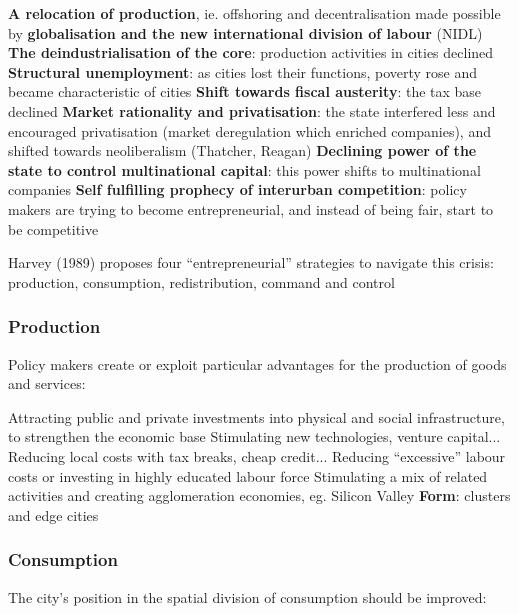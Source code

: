 \documentclass{article}
\begin{document}
\begin{outline}
	\1 \textbf{A relocation of production}, ie. offshoring and decentralisation made possible by \textbf{globalisation and the new international division of labour} (NIDL)
	\1 \textbf{The deindustrialisation of the core}: production activities in cities declined
	\1 \textbf{Structural unemployment}: as cities lost their functions, poverty rose and became characteristic of cities
	\1 \textbf{Shift towards fiscal austerity}: the tax base declined
	\1 \textbf{Market rationality and privatisation}: the state interfered less and encouraged privatisation (market deregulation which enriched companies), and shifted towards neoliberalism (Thatcher, Reagan)
	\1 \textbf{Declining power of the state to control multinational capital}: this power shifts to multinational companies
	\1 \textbf{Self fulfilling prophecy of interurban competition}: policy makers are trying to become entrepreneurial, and instead of being fair, start to be competitive
\end{outline}

Harvey (1989) proposes four ``entrepreneurial'' strategies to navigate this crisis: production, consumption, redistribution, command and control

\subsubsection{Production}

Policy makers create or exploit particular advantages for the production of goods and services:

\begin{outline}
	\1 Attracting public and private investments into physical and social infrastructure, to strengthen the economic base 
	\1 Stimulating new technologies, venture capital...
	\1 Reducing local costs with tax breaks, cheap credit...
	\1 Reducing ``excessive'' labour costs or investing in highly educated labour force
	\1 Stimulating a mix of related activities and creating agglomeration economies, eg. Silicon Valley
	\1 \textbf{Form}: clusters and edge cities
\end{outline}

\subsubsection{Consumption}

The city's position in the spatial division of consumption should be improved:
\end{document}
